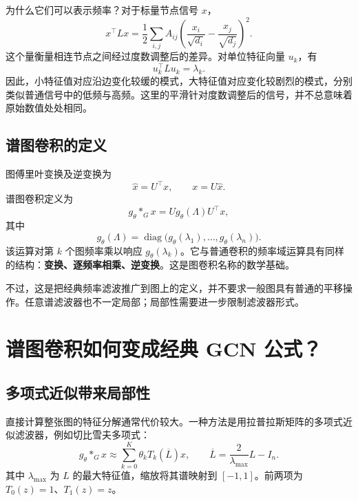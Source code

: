 \documentclass[UTF8,a4paper,11pt,fontset=fandol]{ctexart}
\begin{document}
为什么它们可以表示频率？对于标量节点信号 $x$，
\begin{equation}
x^\top Lx=\frac12\sum_{i,j}A_{ij}
\left(\frac{x_i}{\sqrt{d_i}}-\frac{x_j}{\sqrt{d_j}}\right)^2.
\end{equation}
这个量衡量相连节点之间经过度数调整后的差异。对单位特征向量 $u_k$，有
\begin{equation}
u_k^\top Lu_k=\lambda_k.
\end{equation}
因此，小特征值对应沿边变化较缓的模式，大特征值对应变化较剧烈的模式，分别类似普通信号中的低频与高频。这里的平滑针对度数调整后的信号，并不总意味着原始数值处处相同。

\subsection{谱图卷积的定义}
图傅里叶变换及逆变换为
\begin{equation}
\widehat x=U^\top x,\qquad x=U\widehat x.
\end{equation}
谱图卷积定义为
\begin{equation}
\boxed{g_\theta *_G x=U g_\theta(\Lambda)U^\top x,}
\label{eq:spectral}
\end{equation}
其中
\begin{equation}
g_\theta(\Lambda)=\operatorname{diag}
\bigl(g_\theta(\lambda_1),\ldots,g_\theta(\lambda_n)\bigr).
\end{equation}
该运算对第 $k$ 个图频率乘以响应 $g_\theta(\lambda_k)$。它与普通卷积的频率域运算具有同样的结构：\textbf{变换、逐频率相乘、逆变换}。这是图卷积名称的数学基础。

不过，这是把经典频率滤波推广到图上的定义，并不要求一般图具有普通的平移操作。任意谱滤波器也不一定局部；局部性需要进一步限制滤波器形式。

\section{谱图卷积如何变成经典 GCN 公式？}
\subsection{多项式近似带来局部性}
直接计算整张图的特征分解通常代价较大。一种方法是用拉普拉斯矩阵的多项式近似滤波器，例如切比雪夫多项式：
\begin{equation}
g_\theta *_G x\approx
\sum_{k=0}^{K}\theta_kT_k(\overline L)x,
\qquad
\overline L=\frac{2}{\lambda_{\max}}L-I_n.
\end{equation}
其中 $\lambda_{\max}$ 为 $L$ 的最大特征值，缩放将其谱映射到 $[-1,1]$。前两项为 $T_0(z)=1$、$T_1(z)=z$。
\end{document}
